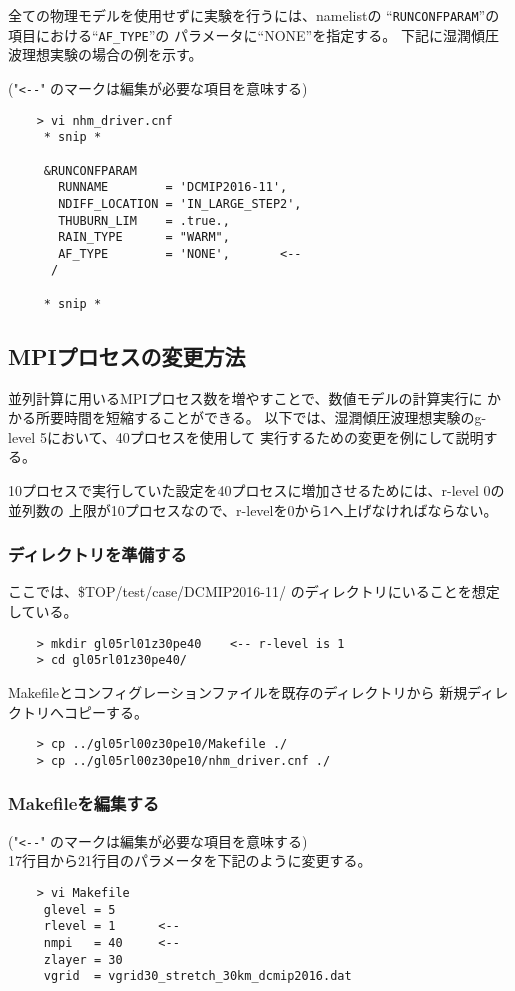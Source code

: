  \noindent 全ての物理モデルを使用せずに実験を行うには、namelistの
``\verb|RUNCONFPARAM|''の項目における``\verb|AF_TYPE|''の
パラメータに``NONE''を指定する。
下記に湿潤傾圧波理想実験の場合の例を示す。


 ("\verb|<--|" のマークは編集が必要な項目を意味する)
 \begin{verbatim}
    > vi nhm_driver.cnf
     * snip *

     &RUNCONFPARAM
       RUNNAME        = 'DCMIP2016-11',
       NDIFF_LOCATION = 'IN_LARGE_STEP2',
       THUBURN_LIM    = .true.,
       RAIN_TYPE      = "WARM",
       AF_TYPE        = 'NONE',       <--
      /

     * snip *
 \end{verbatim}



\subsection{MPIプロセスの変更方法}
 \noindent 並列計算に用いるMPIプロセス数を増やすことで、数値モデルの計算実行に
かかる所要時間を短縮することができる。
以下では、湿潤傾圧波理想実験のg-level 5において、40プロセスを使用して
実行するための変更を例にして説明する。

10プロセスで実行していた設定を40プロセスに増加させるためには、r-level 0の並列数の
上限が10プロセスなので、r-levelを0から1へ上げなければならない。

\subsubsection{ディレクトリを準備する}
 ここでは、\${TOP}/test/case/DCMIP2016-11/ のディレクトリにいることを想定している。
 \begin{verbatim}
    > mkdir gl05rl01z30pe40    <-- r-level is 1
    > cd gl05rl01z30pe40/
 \end{verbatim}

 \noindent Makefileとコンフィグレーションファイルを既存のディレクトリから
新規ディレクトリへコピーする。
 \begin{verbatim}
    > cp ../gl05rl00z30pe10/Makefile ./
    > cp ../gl05rl00z30pe10/nhm_driver.cnf ./
 \end{verbatim}

\subsubsection{Makefileを編集する}
 ("\verb|<--|" のマークは編集が必要な項目を意味する) \\
 17行目から21行目のパラメータを下記のように変更する。
 \begin{verbatim}
    > vi Makefile
     glevel = 5
     rlevel = 1      <--
     nmpi   = 40     <--
     zlayer = 30
     vgrid  = vgrid30_stretch_30km_dcmip2016.dat
 \end{verbatim}

